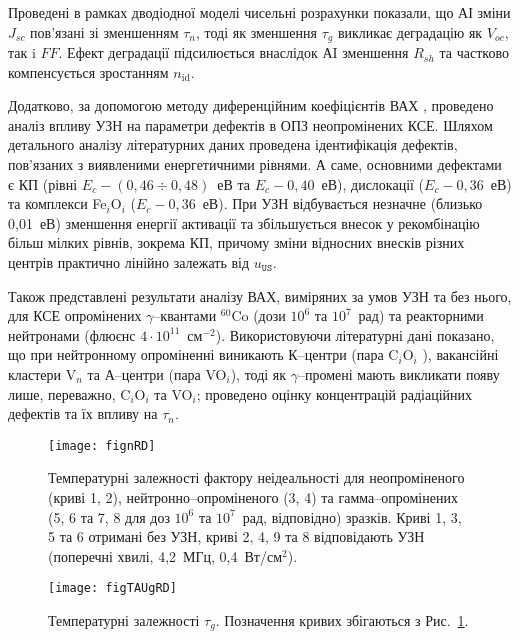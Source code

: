 \documentclass[a5paper,10pt,twoside,openany,article]{memoir} %
\begin{document}
Проведені в рамках дводіодної моделі чисельні розрахунки показали, що АІ зміни $J_{sc}$ пов'язані зі зменшенням $\tau_{n}$,
тоді як зменшення $\tau_{g}$ викликає деградацію як $V_{oc}$, так i $F\!F$.
Ефект деградації підсилюється внаслідок АI зменшення $R_{sh}$ та частково компенсується зростанням $n_\mathrm{id}$.

Додатково, за допомогою методу диференційним коефіцієнтів ВАХ \cite{Bulyar}, проведено аналіз впливу УЗН на параметри дефектів в ОПЗ неопромінених КСЕ.
Шляхом детального аналізу літературних даних проведена ідентифікація дефектів, пов'язаних з виявленими енергетичними рівнями.
А саме, основними дефектами є КП (рівні $E_c-(0,46\div0,48)$~еВ та $E_c-0,40$~еВ), дислокації ($E_c-0,36$~еВ) та комплекси Fe$_i$O$_i$ ($E_c-0,36$~еВ).
При УЗН відбувається незначне (близько 0,01~еВ) зменшення енергії активації та збільшується внесок
у рекомбінацію більш мілких рівнів, зокрема КП, причому зміни відносних внесків різних центрів практично лінійно залежать від $u_\mathtt{US}$.

Також представлені результати аналізу ВАХ, виміряних за умов УЗН та без нього, для КСЕ опромінених $\gamma$--квантами $^{60}$Co (дози $10^6$ та $10^7$~рад) та реакторними нейтронами (флюєнс $4\cdot10^{11}$~см$^{-2}$).
Використовуючи літературні дані показано, що при нейтронному опроміненні виникають К--центри (пара C$_i$O$_i$ ),
вакансійні кластери V$_n$ та А--центри (пара VO$_i$), тоді як $\gamma$--промені мають викликати появу лише, переважно, C$_i$O$_i$ та VO$_i$;
проведено оцінку концентрацій радіаційних дефектів та їх впливу на $\tau_n$.

\begin{figure}[ht]
\center
\texttt{[image: fignRD]}%
\caption{\label{fignRD}
Температурні залежності фактору неідеальності
для неопроміненого (криві 1, 2),
нейтронно--опроміненого (3, 4) та
гамма--опромінених (5, 6 та 7, 8 для доз $10^6$ та $10^7$~рад, відповідно)
зразків.
Криві 1, 3, 5 та 6 отримані без УЗН,
криві 2, 4, 9 та 8 відповідають УЗН (поперечні хвилі, 4,2~МГц, 0,4~Вт/см$^2$).
}%
\end{figure}


\begin{figure}[ht]
\center
\texttt{[image: figTAUgRD]}%
\caption{\label{figTAUgRD}
Температурні залежності $\tau_g$.
Позначення кривих збігаються з Рис.~\ref{fignRD}.
}%
\end{figure}
\end{document}
